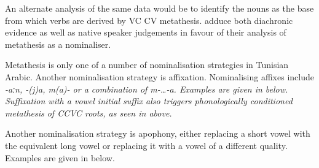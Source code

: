 An alternate analysis of the same data would be to identify the nouns as the base
from which verbs are derived by VC {\ra} CV metathesis.
\cite{kidr86} adduce both diachronic evidence
as well as native speaker judgements in favour of their
analysis of metathesis as a nominaliser.

Metathesis is only one of a number of nominalisation strategies in Tunisian Arabic.
Another nominalisation strategy is affixation.
Nominalising affixes include \it{-aːn}, \it{-(j)a},
\it{m(a)-} or a combination of \it{m-{\ldots}-a}.
Examples are given in  below.
Suffixation with a vowel initial suffix
also triggers phonologically conditioned metathesis of CCVC roots,
as seen in  above.

\begin{exe}
	\label{ex:TunAraAff}
\end{exe}

Another nominalisation strategy is apophony,
either replacing a short vowel with the equivalent long vowel
or replacing it with a vowel of a different quality.
Examples are given in  below.

\begin{exe}
	\label{ex:TunAraApo}
\end{exe}

